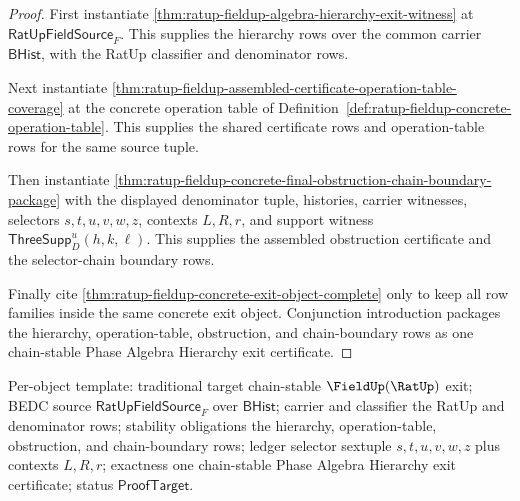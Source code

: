 \begin{proof}
First instantiate
\autoref{thm:ratup-fieldup-algebra-hierarchy-exit-witness} at
$\mathsf{RatUpFieldSource}_F$. This supplies the hierarchy rows over the common
carrier $\mathsf{BHist}$, with the RatUp classifier and denominator rows.

Next instantiate
\autoref{thm:ratup-fieldup-assembled-certificate-operation-table-coverage} at
the concrete operation table of
Definition~\ref{def:ratup-fieldup-concrete-operation-table}. This supplies the
shared certificate rows and operation-table rows for the same source tuple.

Then instantiate
\autoref{thm:ratup-fieldup-concrete-final-obstruction-chain-boundary-package}
with the displayed denominator tuple, histories, carrier witnesses, selectors
$s,t,u,v,w,z$, contexts $L,R,r$, and support witness
$\mathsf{ThreeSupp}_D^u(h,k,\ell)$. This supplies the assembled obstruction
certificate and the selector-chain boundary rows.

Finally cite \autoref{thm:ratup-fieldup-concrete-exit-object-complete} only to
keep all row families inside the same concrete exit object. Conjunction
introduction packages the hierarchy, operation-table, obstruction, and
chain-boundary rows as one chain-stable Phase Algebra Hierarchy exit
certificate.
\end{proof}

Per-object template: traditional target chain-stable $\FieldUp(\RatUp)$ exit;
BEDC source $\mathsf{RatUpFieldSource}_F$ over $\mathsf{BHist}$; carrier and
classifier the RatUp and denominator rows; stability obligations the hierarchy,
operation-table, obstruction, and chain-boundary rows; ledger selector sextuple
$s,t,u,v,w,z$ plus contexts $L,R,r$; exactness one chain-stable Phase Algebra
Hierarchy exit certificate; status $\mathsf{ProofTarget}$.

